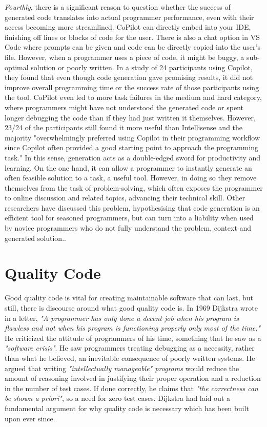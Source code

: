 \documentclass[manuscript,screen,review,sigconf]{acmart}
\begin{document}
\textit{Fourthly}, there is a significant reason to question whether the success of generated code translates into actual programmer performance, even with their access becoming more streamlined. CoPilot can directly embed into your IDE, finishing off lines or blocks of code for the user. There is also a chat option in VS Code where prompts can be given and code can be directly copied into the user's file. However, when a programmer uses a piece of code, it might be buggy, a sub-optimal solution or poorly written. In a study of 24 participants using Copilot\cite{Expectation_vs_Experience}, they found that even though code generation gave promising results, it did not improve overall programming time or the success rate of those participants using the tool. CoPilot even led to more task failures in the medium and hard category, where programmers might have not understood the generated code or spent longer debugging the code than if they had just written it themselves. However, 23/24 of the participants still found it more useful than Intellisense and the majority "overwhelmingly preferred using Copilot in their programming workflow since Copilot often provided a good starting point to approach the programming task." In this sense, generation acts as a double-edged sword for productivity and learning. On the one hand, it can allow a programmer to instantly generate an often feasible solution to a task, a useful tool. However, in doing so they remove themselves from the task of problem-solving, which often exposes the programmer to online discussion and related topics, advancing their technical skill. Other researchers have discussed this problem, hypothesising that code generation is an efficient tool for seasoned programmers, but can turn into a liability when used by novice programmers who do not fully understand the problem, context and generated solution.\cite{CopilotPairProgrammer}.

\section{Quality Code}
Good quality code is vital for creating maintainable software that can last, but still, there is discourse around what good quality code is. In 1969 Dijkstra wrote in a letter, \textit{"A programmer has only done a decent job when his program is flawless and not when his program is functioning properly only most of the time."} He criticized the attitude of programmers of his time, something that he saw as a \textit{"software crisis"}. He saw programmers treating debugging as a necessity, rather than what he believed, an inevitable consequence of poorly written systems. He argued that writing \textit{"intellectually manageable" programs} would reduce the amount of reasoning involved in justifying their proper operation and a reduction in the number of test cases. If done correctly, he claims that \textit{"the correctness can be shown a priori"}, so a need for zero test cases. Dijkstra had laid out a fundamental argument for why quality code is necessary which has been built upon ever since\cite{EWD:EWD288}.
\end{document}

